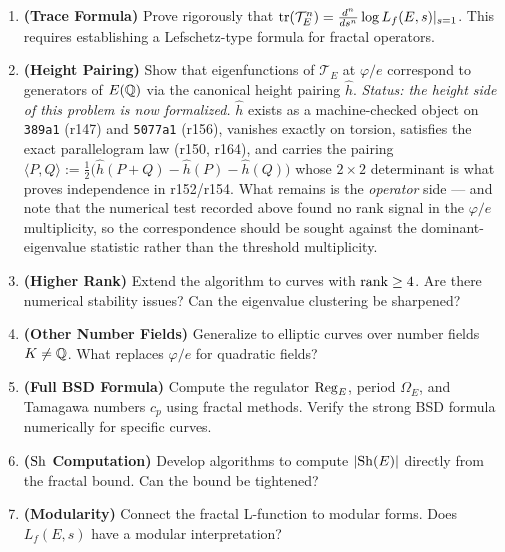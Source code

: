 \begin{enumerate}
\item \textbf{(Trace Formula)} Prove rigorously that $\tr(\mathcal{T}_E^n) = \frac{d^n}{ds^n} \log L_f(E,s)|_{s=1}$. This requires establishing a Lefschetz-type formula for fractal operators.

\item \textbf{(Height Pairing)} Show that eigenfunctions of $\mathcal{T}_E$ at
$\varphi/e$ correspond to generators of $E(\mathbb{Q})$ via the canonical height
pairing $\hat{h}$.  \emph{Status: the height side of this problem is now
formalized.}  $\hat{h}$ exists as a machine-checked object on \texttt{389a1}
(r147) and \texttt{5077a1} (r156), vanishes exactly on torsion, satisfies the
exact parallelogram law (r150, r164), and carries the pairing
$\langle P,Q\rangle := \tfrac12\bigl(\hat{h}(P{+}Q)-\hat{h}(P)-\hat{h}(Q)\bigr)$ whose
$2\times2$ determinant is what proves independence in r152/r154.  What remains
is the \emph{operator} side --- and note that the numerical test recorded above
found no rank signal in the $\varphi/e$ multiplicity, so the correspondence
should be sought against the dominant-eigenvalue statistic rather than the
threshold multiplicity.

\item \textbf{(Higher Rank)} Extend the algorithm to curves with $\operatorname{rank} \geq 4$. Are there numerical stability issues? Can the eigenvalue clustering be sharpened?

\item \textbf{(Other Number Fields)} Generalize to elliptic curves over number fields $K \neq \mathbb{Q}$. What replaces $\varphi/e$ for quadratic fields?

\item \textbf{(Full BSD Formula)} Compute the regulator $\operatorname{Reg}_E$, period $\Omega_E$, and Tamagawa numbers $c_p$ using fractal methods. Verify the strong BSD formula numerically for specific curves.

\item \textbf{($\mathrm{Sh}$ Computation)} Develop algorithms to compute $|\mathrm{Sh}(E)|$ directly from the fractal bound. Can the bound be tightened?

\item \textbf{(Modularity)} Connect the fractal L-function to modular forms. Does $L_f(E,s)$ have a modular interpretation?
\end{enumerate}
